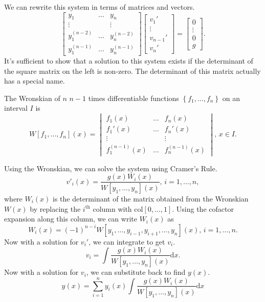 \noindent
We can rewrite this system in terms of matrices and vectors.
\begin{equation*}
	\begin{bmatrix}
		y_1 & \ldots & y_n \\
		\vdots & & \vdots\\
		y_1^{(n-2)} & \ldots & y_n^{(n-2)} \\
		y_1^{(n-1)} & \ldots & y_n^{(n-1)}
	\end{bmatrix} \begin{bmatrix}
		v_1' \\
		\vdots \\
		v_{n-1}' \\
		v_n'
	\end{bmatrix} = \begin{bmatrix}
		0 \\
		\vdots \\
		0 \\
		g
	\end{bmatrix}.
\end{equation*}
It's sufficient to show that a solution to this system exists if the determinant of the square matrix on the left is non-zero. The determinant of this matrix actually has a special name.

\begin{definition}
	The Wronskian of $n$ $n-1$ times differentiable functions $\left\{f_1, \ldots, f_n\right\}$ on an interval $I$ is
	\begin{equation*}
		W[f_1, \ldots, f_n](x) = \begin{vmatrix}
			f_1(x) & \ldots & f_n(x) \\
			f_1'(x) & \ldots & f_n'(x) \\
			\vdots &        & \vdots \\
			f_1^{(n-1)}(x) & \ldots & f_n^{(n-1)}(x)
		\end{vmatrix} \text{, } x \in I.
	\end{equation*}
\end{definition} 

\noindent
Using the Wronskian, we can solve the system using Cramer's Rule.
\begin{equation*}
	v'_i(x) = \frac{g(x)W_i(x)}{W[y_1, \ldots, y_n](x)} \text{, } i = 1, \ldots, n,
\end{equation*}
where $W_i(x)$ is the determinant of the matrix obtained from the Wronskian $W(x)$ by replacing the $i^{\text{th}}$ column with $\text{col}[0, \ldots, 1]$. Using the cofactor expansion along this column, we can write $W_i(x)$ as
\begin{equation*}
	W_i(x) = (-1)^{n-i}W[y_1, \ldots, y_{i-1}, y_{i+1}, \ldots, y_n](x) \text{, } i = 1, \ldots, n.
\end{equation*}
Now with a solution for $v_i'$, we can integrate to get $v_i$.
\begin{equation*}
	v_i = \int{\frac{g(x)W_i(x)}{W[y_1, \ldots, y_n](x)} \mathrm{d}x}.
\end{equation*}
Now with a solution for $v_i$, we can substitute back to find $y(x)$.
\begin{equation*}
	y(x) = \sum_{i=1}^{n}{y_i(x)\int{\frac{g(x)W_i(x)}{W[y_1, \ldots, y_n](x)} \mathrm{d}x}}
\end{equation*}

